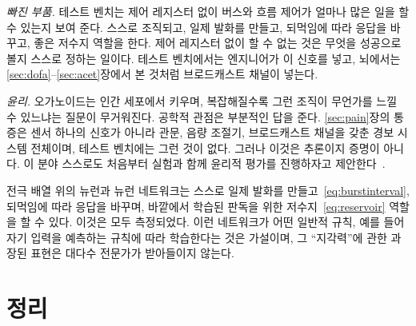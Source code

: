 \emph{빠진 부품.} 테스트 벤치는 제어 레지스터 없이  버스와  흐름 제어가 얼마나 많은 일을 할 수 있는지 보여 준다. 스스로 조직되고, 일제 발화를 만들고, 되먹임에 따라 응답을 바꾸고, 좋은 저수지 역할을 한다. 제어 레지스터 없이 할 수 없는 것은 무엇을 성공으로 볼지 스스로 정하는 일이다. 테스트 벤치에서는 엔지니어가 이 신호를 넣고, 뇌에서는 \ref{sec:dofa}--\ref{sec:acet}장에서 본 것처럼 브로드캐스트 채널이 넣는다.

\emph{윤리.} 오가노이드는 인간 세포에서 키우며, 복잡해질수록 그런 조직이 무언가를 느낄 수 있느냐는 질문이 무거워진다. 공학적 관점은 부분적인 답을 준다. \ref{sec:pain}장의 통증은 센서 하나의 신호가 아니라 관문, 음량 조절기, 브로드캐스트 채널을 갖춘 경보 시스템 전체이며, 테스트 벤치에는 그런 것이 없다. 그러나 이것은 추론이지 증명이 아니다. 이 분야 스스로도 처음부터 실험과 함께 윤리적 평가를 진행하자고 제안한다~\cite{Smirnova2023}.

\begin{keyblock}
\begin{proposition}
\label{prop:livingmachine}
전극 배열 위의  뉴런과  뉴런 네트워크는 스스로 일제 발화를 만들고~\eqref{eq:burstinterval}, 되먹임에 따라 응답을 바꾸며, 바깥에서 학습된 판독을 위한 저수지~\eqref{eq:reservoir} 역할을 할 수 있다. 이것은 모두 측정되었다. 이런 네트워크가 어떤 일반적 규칙, 예를 들어 자기 입력을 예측하는 규칙에 따라 학습한다는 것은 가설이며, 그 “지각력”에 관한 과장된 표현은 대다수 전문가가 받아들이지 않는다.
\end{proposition}
\end{keyblock}



\section{정리}

